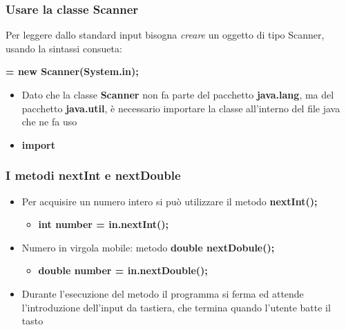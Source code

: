 \begin{frame}
\frametitle{Usare la classe Scanner}
\begin{block}{}
Per leggere dallo standard input bisogna \textit{creare} un oggetto di tipo Scanner, usando la sintassi consueta:
\begin{center}
 \textbf{= new Scanner(System.in);}
\end{center}
\end{block}
\begin{block}{}
\begin{itemize}
\item Dato che la classe \textbf{Scanner} non fa parte del pacchetto \textbf{java.lang}, ma del pacchetto 
\textbf{java.util}, è necessario importare  la classe all'interno del file java che ne fa uso
\item \textbf{import} 
\end{itemize}
\end{block}
\end{frame}

\begin{frame}
\frametitle{I metodi nextInt e nextDouble}
\begin{itemize}
\item Per acquisire un numero intero si può utilizzare il metodo \textbf{nextInt();}
\begin{itemize}
\item \textbf{\alert{int} number = in.next\alert{Int();}}
\end{itemize}
\item Numero in virgola mobile: metodo \textbf{double nextDobule();}
\begin{itemize}
\item \textbf{\alert{double} number = in.next\alert{Double();}}
\end{itemize}
\item Durante l'esecuzione del metodo \alert{il programma si ferma ed attende} l'introduzione dell'input da tastiera,
che termina quando l'utente batte il tasto 
\end{itemize}
\end{frame}

